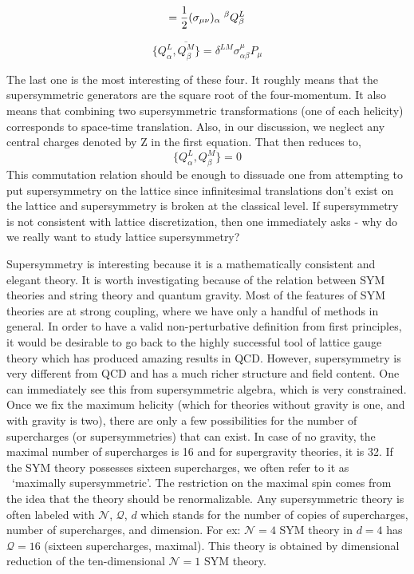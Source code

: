 \begin{equation} 
[Q_{\alpha}^{L}, M_{\mu\nu}]  = \frac{1}{2} (\sigma_{\mu\nu})_{\alpha} \hspace{1mm} ^ {\beta} Q_{\beta}^{L} 
 \end{equation} 

\begin{equation} 
 \{Q_{\alpha}^{L}, \overline{Q_{\beta}^{M}}\} = \delta^{LM} \sigma^{\mu}_{\alpha\beta} P_{\mu}
  \end{equation} 

 The last one is the most interesting of these four. It roughly means that the supersymmetric generators are
 the square root of the four-momentum. It also means that combining two supersymmetric transformations 
 (one of each helicity) corresponds to space-time translation. Also, in our discussion, we neglect any central 
 charges denoted by Z in the first equation. That then reduces to,  
\[ \{Q_{\alpha}^{L}, Q_{\beta}^{M}\} = 0 \]  
This commutation relation should be enough to dissuade one from attempting to put supersymmetry on the lattice since 
infinitesimal translations don't exist on the lattice and supersymmetry is broken at the classical level. If supersymmetry is 
not consistent with lattice discretization, then one immediately asks - why do we really want to study lattice supersymmetry? 

Supersymmetry is interesting because it is a mathematically consistent and elegant theory. It is worth investigating because
of the relation between SYM theories and string theory and quantum gravity. 
Most of the features of SYM theories are at strong coupling, where we have only a handful of methods in general. 
In order to have a valid non-perturbative definition from first principles, it would be desirable to go back to the highly 
successful tool of lattice gauge theory which has produced amazing results in QCD. 
However, supersymmetry is very different from QCD and has a much richer structure and field content. 
One can immediately see this from supersymmetric algebra, which is very constrained. 
Once we fix the maximum helicity (which for theories without gravity is one, and with gravity is two), 
there are only a few possibilities for the number of supercharges (or supersymmetries) that can exist. In case of no gravity, 
the maximal number of supercharges is 
16 and for supergravity theories, it is 32. If the SYM theory possesses sixteen supercharges, 
we often refer to it as ~`maximally supersymmetric'.
The restriction on the maximal spin comes from the idea that the theory should be renormalizable.
Any supersymmetric theory is often labeled with $\mathcal{N}$, $\mathcal{Q}$, $d$  which stands for the 
number of copies of supercharges, number of supercharges, and dimension. 
For ex: $\mathcal{N}=4$ SYM theory in $d=4$ has $\mathcal{Q}=16$ (sixteen supercharges, maximal).
This theory is obtained by dimensional reduction of the ten-dimensional $\mathcal{N}=1$ SYM theory. 

